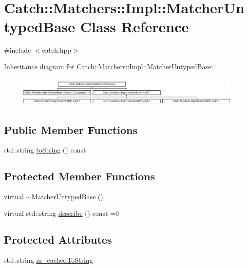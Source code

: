 \hypertarget{classCatch_1_1Matchers_1_1Impl_1_1MatcherUntypedBase}{\section{Catch\-:\-:Matchers\-:\-:Impl\-:\-:Matcher\-Untyped\-Base Class Reference}
\label{classCatch_1_1Matchers_1_1Impl_1_1MatcherUntypedBase}
}


{\ttfamily \#include $<$catch.\-hpp$>$}

Inheritance diagram for Catch\-:\-:Matchers\-:\-:Impl\-:\-:Matcher\-Untyped\-Base\-:\begin{figure}[H]
\begin{center}
\leavevmode
\includegraphics[height=1.509434cm]{classCatch_1_1Matchers_1_1Impl_1_1MatcherUntypedBase}
\end{center}
\end{figure}
\subsection*{Public Member Functions}
\begin{DoxyCompactItemize}
\item 
std\-::string \hyperlink{classCatch_1_1Matchers_1_1Impl_1_1MatcherUntypedBase_a9667f989b08e52a1ce96c955456db8f9}{to\-String} () const 
\end{DoxyCompactItemize}
\subsection*{Protected Member Functions}
\begin{DoxyCompactItemize}
\item 
virtual \hyperlink{classCatch_1_1Matchers_1_1Impl_1_1MatcherUntypedBase_a853be93ce33f71b5abede38081c79e9d}{$\sim$\-Matcher\-Untyped\-Base} ()
\item 
virtual std\-::string \hyperlink{classCatch_1_1Matchers_1_1Impl_1_1MatcherUntypedBase_a91d3a907dbfcbb596077df24f6e11fe2}{describe} () const =0
\end{DoxyCompactItemize}
\subsection*{Protected Attributes}
\begin{DoxyCompactItemize}
\item 
std\-::string \hyperlink{classCatch_1_1Matchers_1_1Impl_1_1MatcherUntypedBase_a951095c462657e7097a9a6dc4dde813f}{m\-\_\-cached\-To\-String}
\end{DoxyCompactItemize}


